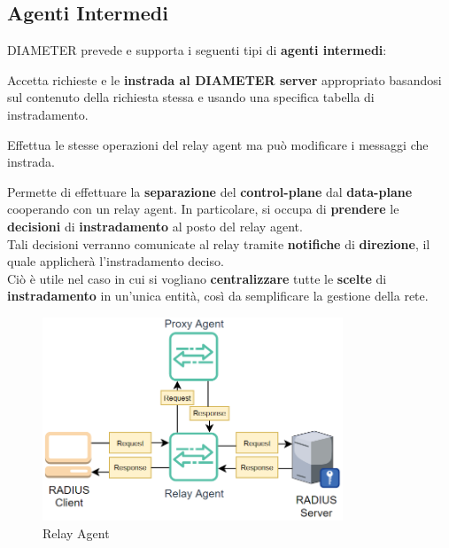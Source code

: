 \subsection{Agenti Intermedi}
DIAMETER prevede e supporta i seguenti tipi di \textbf{agenti intermedi}:
\begin{definition}
Accetta richieste e le \textbf{instrada al DIAMETER server} appropriato basandosi sul contenuto della richiesta stessa e usando una specifica tabella di instradamento.
\end{definition}

\begin{definition}
Effettua le stesse operazioni del relay agent ma può modificare i messaggi che instrada.
\end{definition}

\begin{definition}
 Permette di effettuare la \textbf{separazione} del \textbf{control-plane} dal \textbf{data-plane} cooperando con un relay agent. In particolare, si occupa di \textbf{prendere} le \textbf{decisioni} di \textbf{instradamento} al posto del relay agent.\\
 Tali decisioni verranno comunicate al relay tramite \textbf{notifiche} di \textbf{direzione}, il quale applicherà l'instradamento deciso.\\
 Ciò è utile nel caso in cui si vogliano \textbf{centralizzare} tutte le \textbf{scelte} di \textbf{instradamento} in un'unica entità, così da semplificare la gestione della rete.
\end{definition}

\begin{figure}[ht]
    \centering
    \includegraphics[width=0.8\textwidth]{image/relayagent.png}
    \caption{Relay Agent}
    \label{fig:relayagent}
\end{figure}